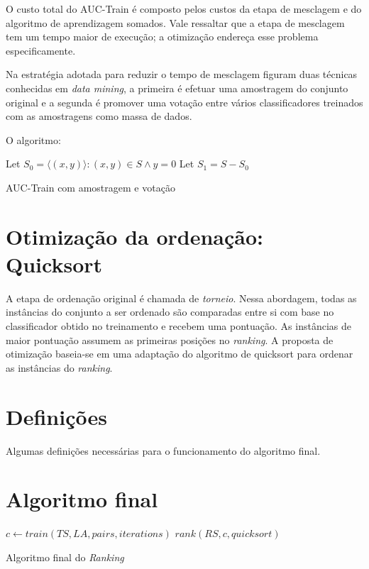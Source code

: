 O custo total do AUC-Train é composto pelos custos da etapa de mesclagem e do algoritmo de aprendizagem somados. Vale ressaltar que a etapa de mesclagem tem um tempo maior de execução; a otimização endereça esse problema especificamente.

Na estratégia adotada para reduzir o tempo de mesclagem figuram duas técnicas conhecidas em \emph{data mining}, a primeira é efetuar uma amostragem do conjunto original e a segunda é promover uma votação entre vários classificadores treinados com as amostragens como massa de dados.

O algoritmo:

\begin{algorithm}
\begin{algorithmic}

\STATE Let $S_0 = {\langle (x, y)\rangle: (x, y) \in S \wedge y = 0}$
\STATE Let $S_1 = S - S_0$


\caption{AUC-Train com amostragem e votação}
\label{alg:auc-train-amostragem-votacao}

\end{algorithmic}
\end{algorithm}

\section{Otimização da ordenação: Quicksort}
A etapa de ordenação original é chamada de \emph{torneio}. Nessa abordagem, todas as instâncias do conjunto a ser ordenado são comparadas entre si com base no classificador obtido no treinamento e recebem uma pontuação. As instâncias de maior pontuação assumem as primeiras posições no \emph{ranking}. A proposta de otimização baseia-se em uma adaptação do algoritmo de quicksort para ordenar as instâncias do \emph{ranking}.

\section{Definições}
Algumas definições necessárias para o funcionamento do algoritmo final.

\section{Algoritmo final}

\begin{algorithm}
\begin{algorithmic}

\STATE $c \gets train(TS, LA, pairs, iterations)$
\STATE $rank(RS, c, quicksort)$

\caption{Algoritmo final do \emph{Ranking}}
\label{alg:ranking}

\end{algorithmic}
\end{algorithm}
